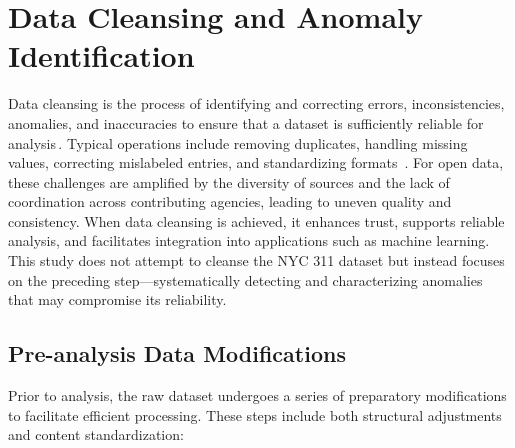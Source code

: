 \documentclass[linenumber]{jdsart}
\begin{document}
\section{Data Cleansing and Anomaly Identification} 
\label{sec:anomalies}
Data cleansing is the process of identifying and correcting errors, 
inconsistencies, anomalies, and inaccuracies to ensure that a dataset is 
sufficiently reliable for analysis\,\citep{maletic2005data,hosseinzadeh2023data}. 
Typical operations include removing duplicates, handling missing values, 
correcting mislabeled entries, and standardizing formats\,
\citep[e.g.,][]{cody2017cody,van2018statistical}. 
For open data, these challenges are amplified by the diversity of sources 
and the lack of coordination across contributing agencies, leading to 
uneven quality and consistency.
When data cleansing is achieved, it enhances trust, supports reliable analysis, and 
facilitates integration into applications such as machine learning. 
This study does not attempt to cleanse the \textsc{NYC 311} dataset but 
instead focuses on the preceding step—systematically detecting and 
characterizing anomalies that may compromise its reliability.


\subsection{Pre-analysis Data Modifications}
\label{subsec:premodifications}
Prior to analysis, the raw dataset undergoes a series of preparatory 
modifications to facilitate efficient processing. These steps 
include both structural adjustments and content standardization:
\end{document}

